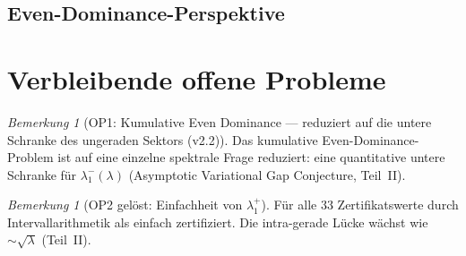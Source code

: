 \documentclass[12pt,a4paper]{article}
\theoremstyle{definition}
\theoremstyle{remark}
\newtheorem{remark}[theorem]{Bemerkung}
\begin{document}
\subsection{Even-Dominance-Perspektive}

\begin{center}
\renewcommand{\arraystretch}{1.2}
\end{center}


\section{Verbleibende offene Probleme}
\label{sec:open-problems}

\begin{remark}[OP1: Kumulative Even Dominance --- reduziert auf die untere Schranke des ungeraden Sektors (v2.2)]
Das kumulative Even-Dominance-Problem ist auf eine einzelne spektrale
Frage reduziert: eine quantitative untere Schranke für $\lambda_1^-(\lambda)$
(Asymptotic Variational Gap Conjecture, Teil~II).
\end{remark}

\begin{remark}[OP2 gelöst: Einfachheit von $\lambda_1^+$]
Für alle $33$ Zertifikatswerte durch Intervallarithmetik als einfach
zertifiziert. Die intra-gerade Lücke wächst wie $\sim\!\sqrt{\lambda}$
(Teil~II).
\end{remark}
\end{document}
